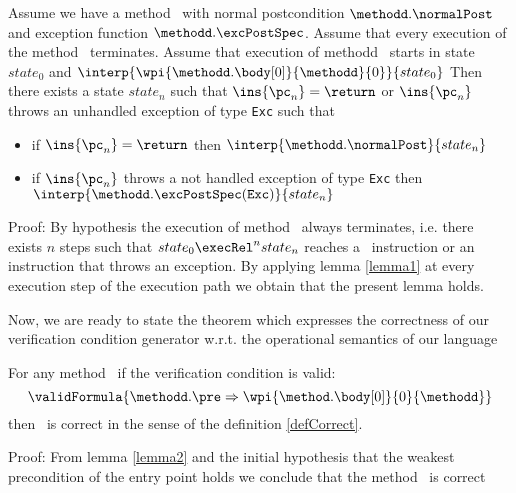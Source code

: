 \begin{lemma2}\label{lemma2}
Assume we have a method \methodd \ with normal postcondition  $\methodd.\normalPost$ and exception function $\methodd.\excPostSpec$. 
Assume that every execution of the method \methodd \ terminates.
 Assume that  execution of methodd \methodd \ starts in state $state_0$ 
and $\interp{ \wpi{\methodd.\body[0] } {\methodd}{0}}{ state_0}$
Then there exists a state $state_n$ such that $\ins{\pc_n} = \return $ or $\ins{\pc_n}$ throws an unhandled 
exception of type \mbox{\rm\texttt{Exc}} such that
\begin{itemize}
    \item if $\ins{\pc_n} = \return $ then $\interp{ \methodd.\normalPost}{state_n}$
    \item  if $\ins{\pc_n}$ throws a not handled exception of type \texttt{Exc} then 
             $\interp{ \methodd.\excPostSpec(\mbox{\rm\texttt{Exc}}  )}{state_n}$
\end{itemize}
\end{lemma2}
Proof: 
By hypothesis the execution of method \methodd \ always terminates, i.e. there exists $n$ steps such that
$ state_0 \execRel^n state_n$ reaches a \return \ instruction or an instruction that throws an exception.
By applying lemma \ref{lemma1} at every execution step of the execution path we obtain that the present lemma holds.



Now, we are ready to state the theorem which expresses the correctness of our verification condition generator
w.r.t. the operational semantics of our language
\begin{vcGenCorrect}\label{vcGenCorrect}
For any  method \methodd \  if the verification condition is valid:
$$ \validFormula{\methodd.\pre \Rightarrow \wpi{\method.\body[0]}{0}{\methodd}} $$
 then \methodd \ is correct in the sense of the definition \ref{defCorrect}. 
\end{vcGenCorrect}
Proof: From lemma \ref{lemma2} and the initial hypothesis that the weakest precondition of the 
entry point holds we conclude that the method \methodd \ is correct

